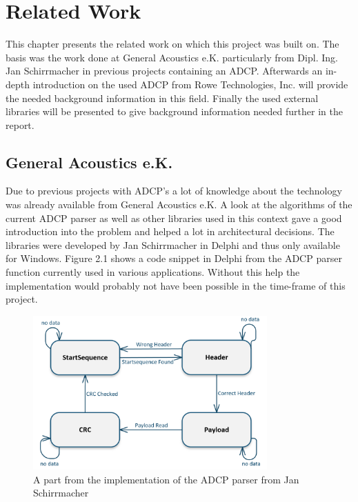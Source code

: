 \chapter{Related Work}
This chapter presents the related work on which this project was built on. The basis was the work done at General Acoustics e.K. particularly from Dipl. Ing. Jan Schirrmacher in previous projects containing an ADCP. Afterwards an in-depth introduction on the used ADCP from Rowe Technologies, Inc. will provide the needed background information in this field. Finally the used external libraries will be presented to give background information needed further in the report.

\section{General Acoustics e.K.}
Due to previous projects with ADCP's a lot of knowledge about the technology was already available from General Acoustics e.K. A look at the algorithms of the current ADCP parser as well as other libraries used in this context gave a good introduction into the problem and helped a lot in architectural decisions. The libraries were developed by Jan Schirrmacher in Delphi and thus only available for Windows. Figure 2.1 shows a code snippet in Delphi from the ADCP parser function currently used in various applications. Without this help the implementation would probably not have been possible in the time-frame of this project.
\begin{figure}[b]
\centering
      \includegraphics[width=0.8\textwidth]{parser}
        \caption{A part from the implementation of the ADCP parser from Jan Schirrmacher}
\end{figure}

